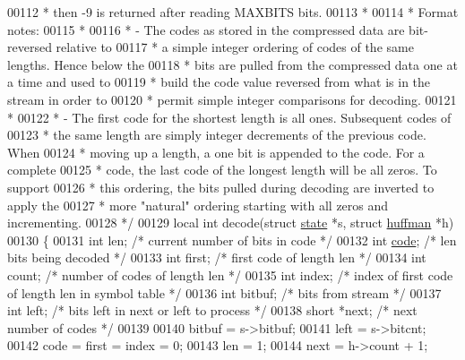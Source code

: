 \begin{DoxyCode}
00112 \textcolor{comment}{ * then -9 is returned after reading MAXBITS bits.}
00113 \textcolor{comment}{ *}
00114 \textcolor{comment}{ * Format notes:}
00115 \textcolor{comment}{ *}
00116 \textcolor{comment}{ * - The codes as stored in the compressed data are bit-reversed relative to}
00117 \textcolor{comment}{ *   a simple integer ordering of codes of the same lengths.  Hence below the}
00118 \textcolor{comment}{ *   bits are pulled from the compressed data one at a time and used to}
00119 \textcolor{comment}{ *   build the code value reversed from what is in the stream in order to}
00120 \textcolor{comment}{ *   permit simple integer comparisons for decoding.}
00121 \textcolor{comment}{ *}
00122 \textcolor{comment}{ * - The first code for the shortest length is all ones.  Subsequent codes of}
00123 \textcolor{comment}{ *   the same length are simply integer decrements of the previous code.  When}
00124 \textcolor{comment}{ *   moving up a length, a one bit is appended to the code.  For a complete}
00125 \textcolor{comment}{ *   code, the last code of the longest length will be all zeros.  To support}
00126 \textcolor{comment}{ *   this ordering, the bits pulled during decoding are inverted to apply the}
00127 \textcolor{comment}{ *   more "natural" ordering starting with all zeros and incrementing.}
00128 \textcolor{comment}{ */}
00129 local \textcolor{keywordtype}{int} decode(\textcolor{keyword}{struct} \hyperlink{structstate}{state} *s, \textcolor{keyword}{struct} \hyperlink{structhuffman}{huffman} *h)
00130 \{
00131     \textcolor{keywordtype}{int} len;            \textcolor{comment}{/* current number of bits in code */}
00132     \textcolor{keywordtype}{int} \hyperlink{structcode}{code};           \textcolor{comment}{/* len bits being decoded */}
00133     \textcolor{keywordtype}{int} first;          \textcolor{comment}{/* first code of length len */}
00134     \textcolor{keywordtype}{int} count;          \textcolor{comment}{/* number of codes of length len */}
00135     \textcolor{keywordtype}{int} index;          \textcolor{comment}{/* index of first code of length len in symbol table */}
00136     \textcolor{keywordtype}{int} bitbuf;         \textcolor{comment}{/* bits from stream */}
00137     \textcolor{keywordtype}{int} left;           \textcolor{comment}{/* bits left in next or left to process */}
00138     \textcolor{keywordtype}{short} *next;        \textcolor{comment}{/* next number of codes */}
00139 
00140     bitbuf = s->bitbuf;
00141     left = s->bitcnt;
00142     code = first = index = 0;
00143     len = 1;
00144     next = h->count + 1;

\end{DoxyCode}
